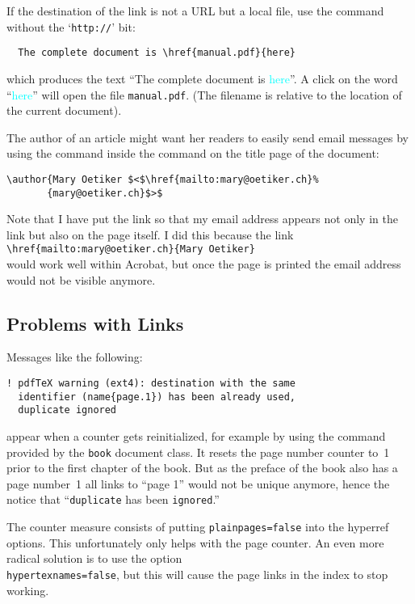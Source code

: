 If the destination of the link is not a URL but a local file,
  use the  command without the \enquote*{\texttt{http://}} bit:
\begin{verbatim}
  The complete document is \href{manual.pdf}{here}
\end{verbatim}
which produces the text ``The complete document is \textcolor{cyan}{here}''.
A click on the word
``\textcolor{cyan}{here}''
will open the file \texttt{manual.pdf}. (The filename is relative to
the location of the current document).

The author of an article might want her readers to easily send
  email messages by using the  command inside the 
  command on the title page of the document:
\begin{code}
\begin{verbatim}
\author{Mary Oetiker $<$\href{mailto:mary@oetiker.ch}%
       {mary@oetiker.ch}$>$
\end{verbatim}
\end{code}
Note that I have put the link so that my email address appears not only
in the link but also on the page itself. I did this because the
link\\
\verb+\href{mailto:mary@oetiker.ch}{Mary Oetiker}+\\
would
work well within Acrobat, but once the page is printed the email address
would not be visible anymore.


\subsection{Problems with Links}

Messages like the following:
\begin{verbatim}
! pdfTeX warning (ext4): destination with the same
  identifier (name{page.1}) has been already used,
  duplicate ignored
\end{verbatim}
appear when a counter gets reinitialized, for example by using
the command  provided by the \texttt{book} document class. It
resets the page number counter to~1 prior to the first chapter of the
book. But as the preface of the book also has a page number~1 all
links to ``page 1'' would not be unique anymore, hence the notice
that ``\verb+duplicate+ has been \verb+ignored+.''

The counter measure consists of putting \texttt{plainpages=false} into
the hyperref options. This unfortunately only helps with the page
counter.
An even more radical solution is to use the option\\
\texttt{hypertexnames=false}, but this will cause the page links in
the index to stop working.


